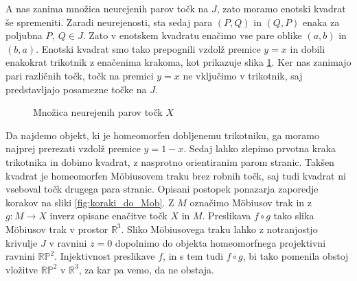 \documentclass[mat1]{fmfdelo}
\newcommand{\R}{\mathbb R}
\newcommand{\arrows}[5][]{
  \draw[->, #1] (#2, #3) -- (0.75*#2 + 0.25*#4, 0.75*#3 + 0.25*#5);
  \draw[->, #1] (0.75*#2 + 0.25*#4, 0.75*#3 + 0.25*#5) -- (0.5*#2 + 0.5*#4, 0.5*#3 + 0.5*#5);
  \draw[->, #1] (0.5*#2 + 0.5*#4, 0.5*#3 + 0.5*#5) -- (0.25*#2 + 0.75*#4, 0.25*#3 + 0.75*#5);
  \draw[->, #1] (0.25*#2 + 0.75*#4, 0.25*#3 + 0.75*#5) -- (#4, #5);
}
\begin{document}
A nas zanima množica neurejenih parov točk na $J$, zato moramo enotski kvadrat še spremeniti. Zaradi neurejenosti, sta sedaj para $(P, Q)$ in $(Q, P)$ enaka za poljubna $P,\ Q \in J$. Zato v enotskem kvadratu enačimo vse pare oblike $(a, b)$ in $(b, a)$. Enotski kvadrat smo tako prepognili vzdolž premice $y = x$ in dobili enakokrat trikotnik z enačenima krakoma, kot prikazuje slika \ref{fig:prvi_pregib}. Ker nas zanimajo pari različnih točk, točk na premici $y = x$ ne vključimo v trikotnik, saj predstavljajo posamezne točke na $J$. 

\begin{figure}[h!]
\caption{Množica neurejenih parov točk $X$}
\label{fig:prvi_pregib}
\end{figure}

Da najdemo objekt, ki je homeomorfen dobljenemu trikotniku, ga moramo najprej prerezati vzdolž premice $y = 1 - x$. Sedaj lahko zlepimo prvotna kraka trikotnika in dobimo kvadrat, z nasprotno orientiranim parom stranic. Takšen kvadrat je homeomorfen M\"obiusovem traku brez robnih točk, saj tudi kvadrat ni vseboval točk drugega para stranic. Opisani postopek ponazarja zaporedje korakov na sliki \ref{fig:koraki_do_Mob}. Z $M$ označimo M\"obiusov trak in z $g \colon M \to X$ inverz opisane enačitve točk $X$ in $M$. Preslikava $f \circ g$ tako slika M\"obiusov trak v prostor $\R^3$. Sliko M\"obiusovega traku lahko z notranjostjo krivulje $J$ v ravnini $z=0$ dopolnimo do objekta homeomorfnega projektivni ravnini $\R \mathbb{P} ^2$. Injektivnost preslikave $f$, in s tem tudi $f \circ g$, bi tako pomenila obstoj vložitve $\R\mathbb{P}^2$ v $\R^3$, za kar pa vemo, da ne obstaja.
\end{document}
